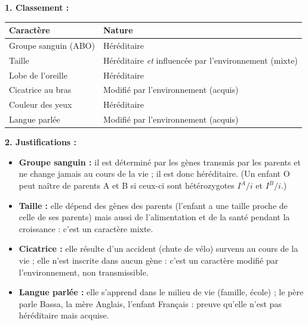 \documentclass[11pt]{article}
\begin{document}
\begin{corrige}
\textbf{1. Classement :}

\begin{center}
\begin{tabularx}{\linewidth}{|l|X|}\hline
\textbf{Caractère} & \textbf{Nature} \\ \hline
Groupe sanguin (ABO) & Héréditaire \\ \hline
Taille & Héréditaire \emph{et} influencée par l'environnement (mixte) \\ \hline
Lobe de l'oreille & Héréditaire \\ \hline
Cicatrice au bras & Modifié par l'environnement (acquis) \\ \hline
Couleur des yeux & Héréditaire \\ \hline
Langue parlée & Modifié par l'environnement (acquis) \\ \hline
\end{tabularx}
\end{center}

\textbf{2. Justifications :}
\begin{itemize}
    \item \textbf{Groupe sanguin :} il est déterminé par les gènes transmis par les parents et ne change jamais au cours de la vie ; il est donc héréditaire. (Un enfant O peut naître de parents A et B si ceux-ci sont hétérozygotes $I^A/i$ et $I^B/i$.)
    \item \textbf{Taille :} elle dépend des gènes des parents (l'enfant a une taille proche de celle de ses parents) mais aussi de l'alimentation et de la santé pendant la croissance : c'est un caractère mixte.
    \item \textbf{Cicatrice :} elle résulte d'un accident (chute de vélo) survenu au cours de la vie ; elle n'est inscrite dans aucun gène : c'est un caractère modifié par l'environnement, non transmissible.
    \item \textbf{Langue parlée :} elle s'apprend dans le milieu de vie (famille, école) ; le père parle Bassa, la mère Anglais, l'enfant Français : preuve qu'elle n'est pas héréditaire mais acquise.
\end{itemize}
\end{corrige}
\end{document}
